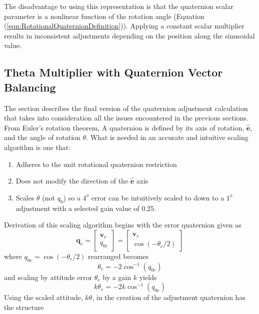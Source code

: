 \documentclass[]{aiaa-tc}%
\newcommand{\bs}[1]{\boldsymbol{#1}}
\begin{document}
The disadvantage to using this representation is that the quaternion scalar parameter is a nonlinear function of the rotation angle (Equation (\ref{eqn:RotationalQuaternionDefinition})).  Applying a constant scalar multiplier results in inconsistent adjustments depending on the position along the sinusoidal value.

\subsection{Theta Multiplier with Quaternion Vector Balancing}
\label{subsec:ThetaMultiplierWithQuaternionVectorBalancing}

The section describes the final version of the quaternion adjustment calculation that takes into consideration all the issues encountered in the previous sections.  From Euler's rotation theorem, A quaternion is defined by its axis of rotation, $\bs{\hat{e}}$, and the angle of rotation $\theta$.  What is needed in an accurate and intuitive scaling algorithm is one that:
\begin{enumerate}
  \item Adheres to the unit rotational quaternion restriction
  \item Does not modify the direction of the $\bs{\hat{e}}$ axis
  \item Scales $\theta$ (not $q_0$) so a $4^o$ error can be intuitively scaled to down to a $1^o$ adjustment with a selected gain value of 0.25.
\end{enumerate}
Derivation of this scaling algorithm begins with the error quaternion given as
\begin{equation}
  \bs{q}_e = \begin{bmatrix} \bs{v}_e \\ q_{0e} \end{bmatrix} = \begin{bmatrix} \bs{v}_e \\ \cos(-\theta_e / 2) \end{bmatrix}
\end{equation}
where $q_{0e} = \cos(-\theta_e/2)$ rearranged becomes
\begin{equation}
  \theta_e = -2 \cos^{-1}(q_{0e})
\end{equation}
and scaling by attitude error $\theta_e$ by a gain $k$ yields
\begin{equation}
  k\theta_e = -2 k\cos^{-1}(q_{0e})
\end{equation}
Using the scaled attitude, $k\theta$, in the creation of the adjustment quaternion has the structure
\end{document}
